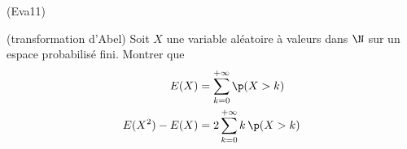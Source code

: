 \begin{tiny}(Eva11)\end{tiny} (transformation d'Abel) Soit $X$ une variable aléatoire à valeurs dans $\N$ sur un espace probabilisé fini. Montrer que
\begin{align*}
 E(X) &= \sum_{k=0}^{+\infty} \p(X> k)\hspace{0.5cm}\\
 E(X^2) - E(X) &= 2\sum_{k=0}^{+\infty}k\,\p(X> k)
\end{align*}
 